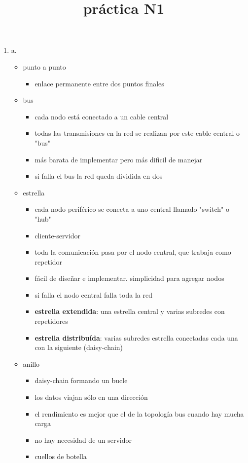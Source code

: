 \documentclass[11pt]{article}
\date{}
\title{práctica N1}
\begin{document}
\maketitle
\begin{enumerate}
\item a.
\begin{itemize}
\item punto a punto
\begin{itemize}
\item enlace permanente entre dos puntos finales
\end{itemize}
\item bus
\begin{itemize}
\item cada nodo está conectado a un cable central
\item todas las transmisiones en la red se realizan por este cable central o "bus"
\item más barata de implementar pero más dificil de manejar
\item si falla el bus la red queda dividida en dos
\end{itemize}
\item estrella
\begin{itemize}
\item cada nodo periférico se conecta a uno central llamado "switch" o "hub"
\item cliente-servidor
\item toda la comunicación pasa por el nodo central, que trabaja como repetidor
\item fácil de diseñar e implementar. simplicidad para agregar nodos
\item si falla el nodo central falla toda la red
\item \textbf{estrella extendida}: una estrella central y varias subredes con repetidores
\item \textbf{estrella distribuída}: varias subredes estrella conectadas cada una con la siguiente (daisy-chain)
\end{itemize}
\item anillo
\begin{itemize}
\item daisy-chain formando un bucle
\item los datos viajan sólo en una dirección
\item el rendimiento es mejor que el de la topología bus cuando hay mucha carga
\item no hay necesidad de un servidor
\item cuellos de botella

\end{itemize}
\end{itemize}
\end{enumerate}
\end{document}
